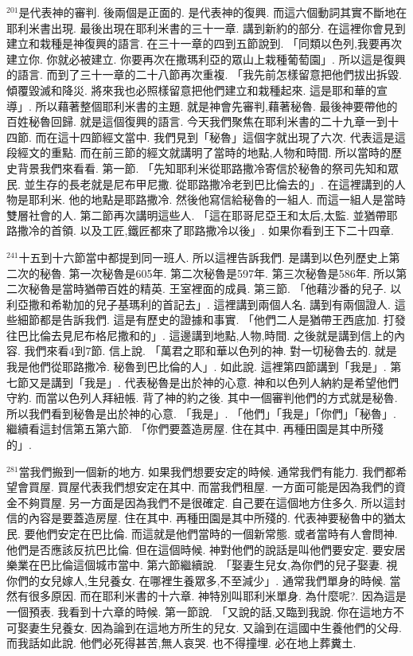 \documentclass{book}
\begin{document}
$^{201}$是代表神的審判.
後兩個是正面的.
是代表神的復興.
而這六個動詞其實不斷地在耶利米書出現.
最後出現在耶利米書的三十一章.
講到新約的部分.
在這裡你會見到建立和栽種是神復興的語言.
在三十一章的四到五節說到.
「同類以色列,我要再次建立你.
你就必被建立.
你要再次在撒瑪利亞的眾山上栽種葡萄園」.
所以這是復興的語言.
而到了三十一章的二十八節再次重複.
「我先前怎樣留意把他們拔出拆毀.
傾覆毀滅和降災.
將來我也必照樣留意把他們建立和栽種起來.
這是耶和華的宣導」.
所以藉著整個耶利米書的主題.
就是神會先審判,藉著秘魯.
最後神要帶他的百姓秘魯回歸.
就是這個復興的語言.
今天我們聚焦在耶利米書的二十九章一到十四節.
而在這十四節經文當中.
我們見到「秘魯」這個字就出現了六次.
代表這是這段經文的重點.
而在前三節的經文就講明了當時的地點,人物和時間.
所以當時的歷史背景我們來看看.
第一節.
「先知耶利米從耶路撒冷寄信於秘魯的祭司先知和眾民.
並生存的長老就是尼布甲尼撒.
從耶路撒冷老到巴比倫去的」.
在這裡講到的人物是耶利米.
他的地點是耶路撒冷.
然後他寫信給秘魯的一組人.
而這一組人是當時雙層社會的人.
第二節再次講明這些人.
「這在耶哥尼亞王和太后,太監.
並猶帶耶路撒冷的首領.
以及工匠,鐵匠都來了耶路撒冷以後」.
如果你看到王下二十四章.

$^{241}$十五到十六節當中都提到同一班人.
所以這裡告訴我們.
是講到以色列歷史上第二次的秘魯.
第一次秘魯是605年.
第二次秘魯是597年.
第三次秘魯是586年.
所以第二次秘魯是當時猶帶百姓的精英.
王室裡面的成員.
第三節.
「他藉沙番的兒子.
以利亞撒和希勒加的兒子基瑪利的首記去」.
這裡講到兩個人名.
講到有兩個證人.
這些細節都是告訴我們.
這是有歷史的證據和事實.
「他們二人是猶帶王西底加.
打發往巴比倫去見尼布格尼撒和的」.
這邊講到地點,人物,時間.
之後就是講到信上的內容.
我們來看4到7節.
信上說.
「萬君之耶和華以色列的神.
對一切秘魯去的.
就是我是他們從耶路撒冷.
秘魯到巴比倫的人」.
如此說.
這裡第四節講到「我是」.
第七節又是講到「我是」.
代表秘魯是出於神的心意.
神和以色列人納約是希望他們守約.
而當以色列人拜紐帳.
背了神的約之後.
其中一個審判他們的方式就是秘魯.
所以我們看到秘魯是出於神的心意.
「我是」.
「他們」「我是」「你們」「秘魯」.
繼續看這封信第五第六節.
「你們要蓋造房屋.
住在其中.
再種田園是其中所殘的」.

$^{281}$當我們搬到一個新的地方.
如果我們想要安定的時候.
通常我們有能力.
我們都希望會買屋.
買屋代表我們想安定在其中.
而當我們租屋.
一方面可能是因為我們的資金不夠買屋.
另一方面是因為我們不是很確定.
自己要在這個地方住多久.
所以這封信的內容是要蓋造房屋.
住在其中.
再種田園是其中所殘的.
代表神要秘魯中的猶太民.
要他們安定在巴比倫.
而這就是他們當時的一個新常態.
或者當時有人會問神.
他們是否應該反抗巴比倫.
但在這個時候.
神對他們的說話是叫他們要安定.
要安居樂業在巴比倫這個城市當中.
第六節繼續說.
「娶妻生兒女,為你們的兒子娶妻.
視你們的女兒嫁人,生兒養女.
在哪裡生養眾多,不至減少」.
通常我們單身的時候.
當然有很多原因.
而在耶利米書的十六章.
神特別叫耶利米單身.
為什麼呢?.
因為這是一個預表.
我看到十六章的時候.
第一節說.
「又說的話,又臨到我說.
你在這地方不可娶妻生兒養女.
因為論到在這地方所生的兒女.
又論到在這國中生養他們的父母.
而我話如此說.
他們必死得甚苦,無人哀哭.
也不得撞埋.
必在地上葬糞土.
\end{document}
